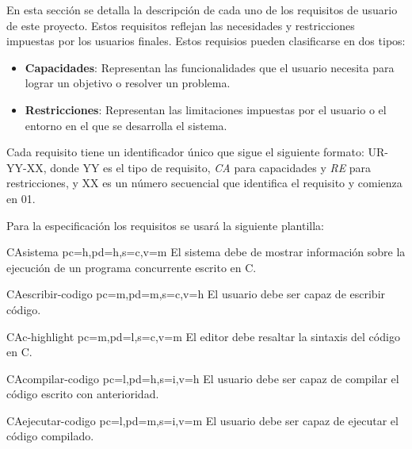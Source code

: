 En esta sección se detalla la descripción de cada uno de los requisitos de usuario de este proyecto. Estos requisitos reflejan las necesidades y restricciones impuestas por los usuarios finales. Estos requisios pueden clasificarse en dos tipos:
\begin{itemize}
    \item \textbf{Capacidades}: Representan las funcionalidades que el usuario necesita para lograr un objetivo o resolver un problema.
    \item \textbf{Restricciones}: Representan las limitaciones impuestas por el usuario o el entorno en el que se desarrolla el sistema.
\end{itemize}

Cada requisito tiene un identificador único que sigue el siguiente formato: UR-YY-XX, donde YY es el tipo de requisito, \textit{CA} para capacidades y \textit{RE} para restricciones, y XX es un número secuencial que identifica el requisito y comienza en 01.

Para la especificación los requisitos se usará la siguiente plantilla:

\printureqtemplate{}

\begin{userReq}{CA}{sistema}
    {pc=h,pd=h,s=c,v=m}
    El sistema debe de mostrar información sobre la ejecución de un programa concurrente escrito en C.
\end{userReq}

\begin{userReq}{CA}{escribir-codigo}
    {pc=m,pd=m,s=c,v=h}
    El usuario debe ser capaz de escribir código.
\end{userReq}

\begin{userReq}{CA}{c-highlight}
    {pc=m,pd=l,s=c,v=m}
    El editor debe resaltar la sintaxis del código en C.
\end{userReq}

\begin{userReq}{CA}{compilar-codigo}
    {pc=l,pd=h,s=i,v=h}
    El usuario debe ser capaz de compilar el código escrito con anterioridad.
\end{userReq}

\begin{userReq}{CA}{ejecutar-codigo}
    {pc=l,pd=m,s=i,v=m}
    El usuario debe ser capaz de ejecutar el código compilado.
\end{userReq}

